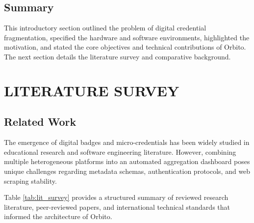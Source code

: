 \documentclass[12pt,a4paper]{article}
\begin{document}
\subsection{Summary}
This introductory section outlined the problem of digital credential fragmentation, specified the hardware and software environments, highlighted the motivation, and stated the core objectives and technical contributions of Orbito. The next section details the literature survey and comparative background.

\newpage

\section{LITERATURE SURVEY}

\subsection{Related Work}
The emergence of digital badges and micro-credentials has been widely studied in educational research and software engineering literature. However, combining multiple heterogeneous platforms into an automated aggregation dashboard poses unique challenges regarding metadata schemas, authentication protocols, and web scraping stability.

Table \ref{tab:lit_survey} provides a structured summary of reviewed research literature, peer-reviewed papers, and international technical standards that informed the architecture of Orbito.
\end{document}
